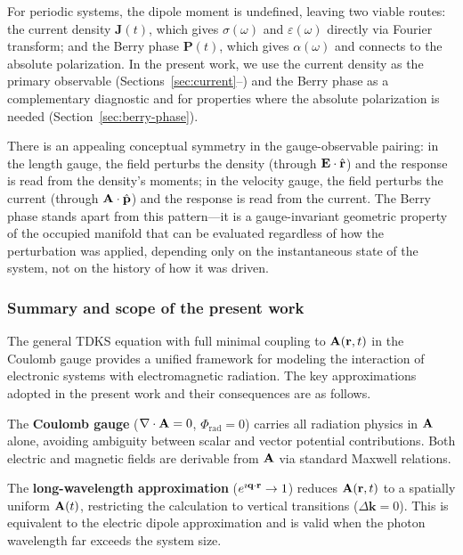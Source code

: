 For periodic systems, the dipole moment is undefined, leaving two
viable routes: the current density $\mathbf{J}(t)$, which gives
$\sigma(\omega)$ and $\varepsilon(\omega)$ directly via Fourier
transform; and the Berry phase $\mathbf{P}(t)$, which gives
$\alpha(\omega)$ and connects to the absolute polarization.
In the present work, we use the current density as the primary
observable (Sections~\ref{sec:current}--\myblue{[2.6]}) and the
Berry phase as a complementary diagnostic and for properties
where the absolute polarization is needed
(Section~\ref{sec:berry-phase}).

There is an appealing conceptual symmetry in the
gauge-observable pairing: in the length gauge, the field perturbs
the density (through $\mathbf{E}\cdot\hat{\mathbf{r}}$) and the response
is read from the density's moments; in the velocity gauge, the field
perturbs the current (through $\mathbf{A}\cdot\hat{\mathbf{p}}$) and the response is
read from the current.
The Berry phase stands apart from this pattern---it is a
gauge-invariant geometric property of the occupied manifold that can
be evaluated regardless of how the perturbation was applied,
depending only on the instantaneous state of the system, not on the
history of how it was driven.


\subsubsection{Summary and scope of the present work}
\label{sec:em-summary}

The general TDKS equation with full minimal coupling to
$\mathbf{A}(\mathbf{r},t)$ in the Coulomb gauge provides a unified
framework for modeling the interaction of electronic systems with
electromagnetic radiation.
The key approximations adopted in the present work and their
consequences are as follows.

The \textbf{Coulomb gauge} ($\nabla\cdot\mathbf{A} = 0$,
$\Phi_\text{rad} = 0$) carries all radiation physics in $\mathbf{A}$
alone, avoiding ambiguity between scalar and vector potential
contributions.
Both electric and magnetic fields are derivable from $\mathbf{A}$ via
standard Maxwell relations.

The \textbf{long-wavelength approximation}
($e^{\imath\mathbf{q}\cdot\mathbf{r}} \to 1$) reduces
$\mathbf{A}(\mathbf{r},t)$ to a spatially uniform $\mathbf{A}(t)$,
restricting the calculation to vertical transitions
($\Delta\mathbf{k} = 0$).
This is equivalent to the electric dipole approximation and is valid
when the photon wavelength far exceeds the system size.

